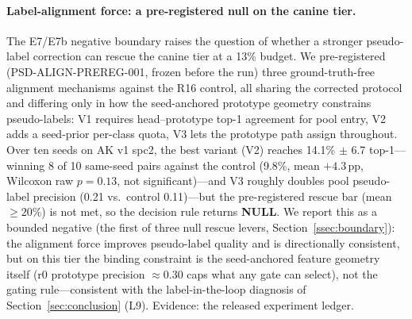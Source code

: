 \paragraph{Label-alignment force: a pre-registered null on the canine tier.}
The E7/E7b negative boundary raises the question of whether a stronger pseudo-label correction can rescue the canine tier at a 13\% budget. We pre-registered (PSD-ALIGN-PREREG-001, frozen before the run) three ground-truth-free alignment mechanisms against the R16 control, all sharing the corrected protocol and differing only in how the seed-anchored prototype geometry constrains pseudo-labels: V1 requires head--prototype top-1 agreement for pool entry, V2 adds a seed-prior per-class quota, V3 lets the prototype path assign throughout. Over ten seeds on AK v1 spc2, the best variant (V2) reaches 14.1\% $\pm$ 6.7 top-1---winning 8 of 10 same-seed pairs against the control (9.8\%, mean $+4.3$\,pp, Wilcoxon raw $p=0.13$, not significant)---and V3 roughly doubles pool pseudo-label precision (0.21 vs.\ control 0.11)---but the pre-registered rescue bar (mean $\geq 20\%$) is not met, so the decision rule returns \textbf{NULL}. We report this as a bounded negative (the first of three null rescue levers, Section~\ref{ssec:boundary}): the alignment force improves pseudo-label quality and is directionally consistent, but on this tier the binding constraint is the seed-anchored feature geometry itself (r0 prototype precision $\approx$0.30 caps what any gate can select), not the gating rule---consistent with the label-in-the-loop diagnosis of Section~\ref{sec:conclusion} (L9). Evidence: the released experiment ledger.

